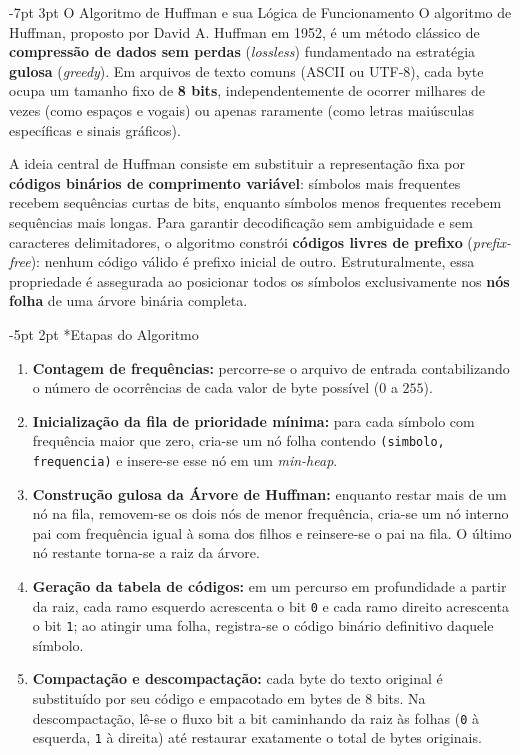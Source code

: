 \documentclass[a4paper,10pt]{article}
\makeatletter
\renewcommand\section{\@startsection {section}{1}{\z@}%
                                   {-7pt \@plus -2pt \@minus -1pt}%
                                   {3pt \@plus 1pt}%
                                   {\normalfont\large\bfseries}}
\renewcommand\subsection{\@startsection{subsection}{2}{\z@}%
                                     {-5pt \@plus -1pt \@minus -1pt}%
                                     {2pt \@plus 1pt}%
                                     {\normalfont\normalsize\bfseries}}
\makeatother
\begin{document}
\section{O Algoritmo de Huffman e sua Lógica de Funcionamento}
O algoritmo de Huffman, proposto por David A. Huffman em 1952, é um método clássico de \textbf{compressão de dados sem perdas} (\emph{lossless}) fundamentado na estratégia \textbf{gulosa} (\emph{greedy}). Em arquivos de texto comuns (ASCII ou UTF-8), cada byte ocupa um tamanho fixo de \textbf{8 bits}, independentemente de ocorrer milhares de vezes (como espaços e vogais) ou apenas raramente (como letras maiúsculas específicas e sinais gráficos).

A ideia central de Huffman consiste em substituir a representação fixa por \textbf{códigos binários de comprimento variável}: símbolos mais frequentes recebem sequências curtas de bits, enquanto símbolos menos frequentes recebem sequências mais longas. Para garantir decodificação sem ambiguidade e sem caracteres delimitadores, o algoritmo constrói \textbf{códigos livres de prefixo} (\emph{prefix-free}): nenhum código válido é prefixo inicial de outro. Estruturalmente, essa propriedade é assegurada ao posicionar todos os símbolos exclusivamente nos \textbf{nós folha} de uma árvore binária completa.

\subsection*{Etapas do Algoritmo}
\begin{enumerate}\setlength{\itemsep}{1.5pt}\setlength{\parskip}{0pt}\setlength{\topsep}{2pt}
  \item \textbf{Contagem de frequências:} percorre-se o arquivo de entrada contabilizando o número de ocorrências de cada valor de byte possível ($0$ a $255$).
  \item \textbf{Inicialização da fila de prioridade mínima:} para cada símbolo com frequência maior que zero, cria-se um nó folha contendo \texttt{(simbolo, frequencia)} e insere-se esse nó em um \emph{min-heap}.
  \item \textbf{Construção gulosa da Árvore de Huffman:} enquanto restar mais de um nó na fila, removem-se os dois nós de menor frequência, cria-se um nó interno pai com frequência igual à soma dos filhos e reinsere-se o pai na fila. O último nó restante torna-se a raiz da árvore.
  \item \textbf{Geração da tabela de códigos:} em um percurso em profundidade a partir da raiz, cada ramo esquerdo acrescenta o bit \texttt{0} e cada ramo direito acrescenta o bit \texttt{1}; ao atingir uma folha, registra-se o código binário definitivo daquele símbolo.
  \item \textbf{Compactação e descompactação:} cada byte do texto original é substituído por seu código e empacotado em bytes de 8 bits. Na descompactação, lê-se o fluxo bit a bit caminhando da raiz às folhas (\texttt{0} à esquerda, \texttt{1} à direita) até restaurar exatamente o total de bytes originais.
\end{enumerate}
\end{document}
